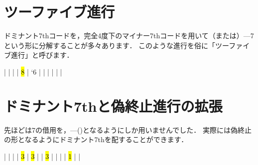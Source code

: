 \documentclass[dvipdfmx,uplatex,b5paper,openany,jbase=12Q,nomag*,textwidth-limit=44%
               ]{gachimuchi}
\begin{document}
\section{ツーファイブ進行}
ドミナント7thコードを，完全4度下のマイナー7thコードを用いて\Gnii\Min{}（または\Gnii \hDim{}）---\Gnv\subsc7という形に分解することが多々あります．
このような進行を俗に「ツーファイブ進行」と呼びます．
\begin{Music}
  \generalmeter{\meterC}%
  \Startpiece
  \NOTes%
  |\en%
  \NOtes%
  |%
  \en%
  \bar%
  \NOTes%
  |%
  \hl{8}\en%
  \NOtes%
  |%
  \lq{6}%
  \en%
  \bar%
  \NOtes%
  \sk%
  |%
  \en%
  \bar%
  \NOTEs%
  |%
  \en%
  \bar%
  \NOTEs%
  |%
  \en%
  \setdoubleBAR\endpiece
\end{Music}
\section{ドミナント7thと偽終止進行の拡張}
先ほどは\Gnv 7の借用を，\Gnv{}---\Gni(\Min)となるようにしか用いませんでした．
実際には偽終止の形となるようにドミナント7thを配することができます．

\begin{Music}
  \generalmeter{\meterC}%
  \Startpiece%
  \NOTes%
  |%
  \en%
  \NOTes%
  |%
  \en%
  \bar%
  \NOTes%
  \lrchordsl{[&\Funktion{Tp}]}|%
  \hl{3}\en%
  \NOTes%
  |%
  \hl{3}\en%
  \bar%
  \NOTes%
  |%
  \hl{3}\en%
  \NOTes%
  |%
  \en%
  \bar%
  \NOTes%
  |%
  \en%
  \NOTes%
  |%
  \hl{1}\en%
  \bar%
  \NOTEs%
  |%
  \en%
  \setdoubleBAR\endpiece
\end{Music}
\end{document}
